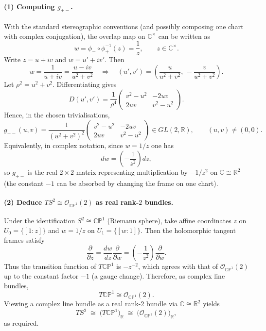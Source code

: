 \documentclass[12pt,a4paper]{article}
\theoremstyle{plain}
\theoremstyle{definition}      %
\begin{document}
\paragraph{(1) Computing $g_{+-}$.}
With the standard stereographic conventions (and possibly composing one chart with complex conjugation),
the overlap map on $\mathbb{C}^\times$ can be written as
\[
w=\phi_-\circ\phi_+^{-1}(z)=\frac{1}{z},\qquad z\in\mathbb{C}^\times.
\]
Write $z=u+iv$ and $w=u'+iv'$. Then
\[
w=\frac{1}{u+iv}=\frac{u-iv}{u^2+v^2}
\quad\Longrightarrow\quad
(u',v')=\left(\frac{u}{u^2+v^2},\,-\frac{v}{u^2+v^2}\right).
\]
Let $\rho^2=u^2+v^2$. Differentiating gives
\[
D(u',v')
=
\frac{1}{\rho^4}
\begin{pmatrix}
	v^2-u^2 & -2uv\\
	2uv & v^2-u^2
\end{pmatrix}.
\]
Hence, in the chosen trivialisations,
\[
\boxed{
	g_{+-}(u,v)=
	\frac{1}{(u^2+v^2)^2}
	\begin{pmatrix}
		v^2-u^2 & -2uv\\
		2uv & v^2-u^2
	\end{pmatrix}
	\in GL(2,\mathbb{R}),\qquad (u,v)\neq(0,0).
}
\]
Equivalently, in complex notation, since $w=1/z$ one has
\[
dw=\left(-\frac{1}{z^2}\right)dz,
\]
so $g_{+-}$ is the real $2\times 2$ matrix representing multiplication by $-1/z^2$ on $\mathbb{C}\cong\mathbb{R}^2$
(the constant $-1$ can be absorbed by changing the frame on one chart).

\paragraph{(2) Deduce $TS^2\cong \mathcal{O}_{\mathbb{CP}^1}(2)$ as real rank-$2$ bundles.}
Under the identification $S^2\cong\mathbb{CP}^1$ (Riemann sphere), take affine coordinates
$z$ on $U_0=\{[1:z]\}$ and $w=1/z$ on $U_1=\{[w:1]\}$. Then the holomorphic tangent frames satisfy
\[
\frac{\partial}{\partial z}
=
\frac{dw}{dz}\frac{\partial}{\partial w}
=
\left(-\frac{1}{z^2}\right)\frac{\partial}{\partial w}.
\]
Thus the transition function of $T\mathbb{CP}^1$ is $-z^{-2}$, which agrees with that of $\mathcal{O}_{\mathbb{CP}^1}(2)$
up to the constant factor $-1$ (a gauge change). Therefore, as complex line bundles,
\[
T\mathbb{CP}^1 \cong \mathcal{O}_{\mathbb{CP}^1}(2).
\]
Viewing a complex line bundle as a real rank-$2$ bundle via $\mathbb{C}\cong\mathbb{R}^2$ yields
\[
TS^2 \;\cong\; \bigl(T\mathbb{CP}^1\bigr)_{\mathbb{R}}
\;\cong\; \bigl(\mathcal{O}_{\mathbb{CP}^1}(2)\bigr)_{\mathbb{R}},
\]
as required.
\end{document}
